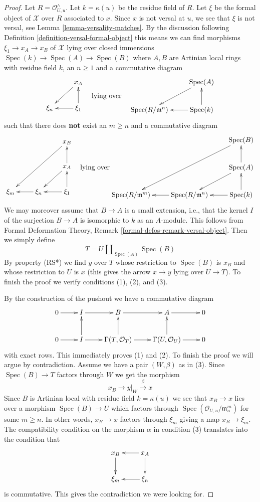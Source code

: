 \documentclass{stacks-project}
\theoremstyle{plain}
\theoremstyle{definition}
\theoremstyle{remark}
\numberwithin{equation}{subsection}
\def\Spec{\mathop{\mathrm{Spec}}}
\begin{document}
\begin{proof}
Let $R = \mathcal{O}_{U, u}^\wedge$. Let $k = \kappa(u)$
be the residue field of $R$. Let $\xi$ be the formal object
of $\mathcal{X}$ over $R$ associated to $x$. Since $x$ is not
versal at $u$, we see that $\xi$ is not versal, see
Lemma \ref{lemma-versality-matches}. By the discussion following
Definition \ref{definition-versal-formal-object}
this means we can find
morphisms $\xi_1 \to x_A \to x_B$ of $\mathcal{X}$ lying over
closed immersions $\Spec(k) \to \Spec(A) \to \Spec(B)$
where $A, B$ are Artinian local rings with residue field $k$,
an $n \geq 1$ and a commutative diagram
$$
\vcenter{
\xymatrix{
& x_A \ar[ld] \\
\xi_n & \xi_1 \ar[u] \ar[l]
}
}
\quad\text{lying over}\quad
\vcenter{
\xymatrix{
& \Spec(A) \ar[ld] \\
\Spec(R/\mathfrak m^n) & \Spec(k) \ar[u] \ar[l]
}
}
$$
such that there does {\bf not} exist an $m \geq n$ and a commutative diagram
$$
\vcenter{
\xymatrix{
& & x_B \ar[lldd] \\
& & x_A \ar[ld] \ar[u] \\
\xi_m & \xi_n \ar[l] & \xi_1 \ar[u] \ar[l]
}
}
\quad\text{lying over}
\vcenter{
\xymatrix{
& & \Spec(B) \ar[lldd] \\
& & \Spec(A) \ar[ld] \ar[u] \\
\Spec(R/\mathfrak m^m) &
\Spec(R/\mathfrak m^n) \ar[l] &
\Spec(k) \ar[u] \ar[l]
}
}
$$
We may moreover assume that $B \to A$ is a small
extension, i.e., that the kernel $I$ of the surjection $B \to A$
is isomorphic to $k$ as an $A$-module.
This follows from Formal Deformation Theory, Remark
\ref{formal-defos-remark-versal-object}.
Then we simply define
$$
T = U \amalg_{\Spec(A)} \Spec(B)
$$
By property (RS*) we find $y$ over $T$ whose restriction to
$\Spec(B)$ is $x_B$ and whose restriction to $U$ is $x$
(this gives the arrow $x \to y$ lying over $U \to T$).
To finish the proof we verify conditions (1), (2), and (3).

\medskip\noindent
By the construction of the pushout we have a commutative diagram
$$
\xymatrix{
0 \ar[r] &
I \ar[r] &
B \ar[r] &
A \ar[r] &
0 \\
0 \ar[r] &
I \ar[r] \ar[u] &
\Gamma(T, \mathcal{O}_T) \ar[r] \ar[u] &
\Gamma(U, \mathcal{O}_U) \ar[r] \ar[u] &
0
}
$$
with exact rows. This immediately proves (1) and (2).
To finish the proof we will argue by contradiction.
Assume we have a pair $(W, \beta)$ as in (3).
Since $\Spec(B) \to T$ factors through $W$ we get the morphism
$$
x_B \to y|_W \xrightarrow{\beta} x
$$
Since $B$ is Artinian local with residue field $k = \kappa(u)$
we see that $x_B \to x$ lies over a morphism $\Spec(B) \to U$
which factors through $\Spec(\mathcal{O}_{U, u}/\mathfrak m_u^m)$
for some $m \geq n$. In other words, $x_B \to x$ factors
through $\xi_m$ giving a map $x_B \to \xi_m$.
The compatibility condition on the morphism $\alpha$
in condition (3) translates into the condition that
$$
\xymatrix{
x_B \ar[d] & x_A \ar[d] \ar[l] \\
\xi_m & \xi_n \ar[l]
}
$$
is commutative. This gives the contradiction we were looking for.
\end{proof}
\end{document}

